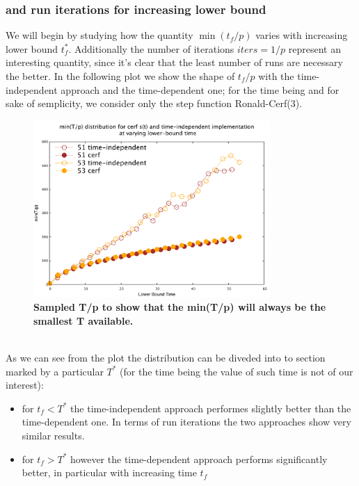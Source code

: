        \subsubsection*{  and run iterations for increasing lower bound }
         We will begin by studying how the quantity $\min(t_f/p)$ varies with increasing lower bound $t_f^*$. Additionally the number of iterations $iters = 1/p$ represent an interesting quantity, since it's clear that the least number of runs are necessary the better.
         In the following plot we show the shape of $t_f/p$ with the time-independent approach and the time-dependent one; for the time being and for sake of semplicity, we consider only the step function Ronald-Cerf(3).
         \begin{figure}[ht]
         \centering
         \includegraphics[width=90mm]{./figures/min_tp/delta.pdf}
         \caption[Sampled T/p ]{\textbf{Sampled T/p to show that the min(T/p) will always be the smallest T available.}}
         \end{figure} \\
        As we can see from the plot the distribution can be diveded into to section marked by a particular $T^*$ (for the time being the value of such time is not of our interest):
        \begin{itemize}
            \item for $t_f<T^*$ the time-independent approach performes slightly better than the time-dependent one. In terms of run iterations the two approaches show very similar results.
            \item for $t_f>T^*$ however the time-dependent approach performs significantly better, in particular with increasing time $t_f$
        \end{itemize}
